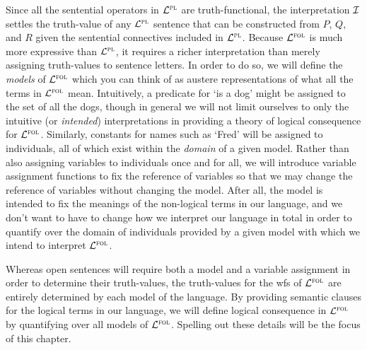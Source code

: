 Since all the sentential operators in $\mathcal{L}^{\textsc{pl}}$ are truth-functional, the interpretation $\mathcal{I}$ settles the truth-value of any $\mathcal{L}^{\textsc{pl}}$ sentence that can be constructed from $P$, $Q$, and $R$ given the sentential connectives included in $\mathcal{L}^{\textsc{pl}}$.
Because $\mathcal{L}^{\textsc{fol}}$ is much more expressive than $\mathcal{L}^{\textsc{pl}}$, it requires a richer interpretation than merely assigning truth-values to sentence letters.
In order to do so, we will define the \textit{models} of $\mathcal{L}^{\textsc{fol}}$ which you can think of as austere representations of what all the terms in $\mathcal{L}^{\textsc{fol}}$ mean. 
Intuitively, a predicate for `is a dog' might be assigned to the set of all the dogs, though in general we will not limit ourselves to only the intuitive (or \textit{intended}) interpretations in providing a theory of logical consequence for $\mathcal{L}^{\textsc{fol}}$.
Similarly, constants for names such as `Fred' will be assigned to individuals, all of which exist within the \textit{domain} of a given model.
Rather than also assigning variables to individuals once and for all, we will introduce variable assignment functions to fix the reference of variables so that we may change the reference of variables without changing the model.
After all, the model is intended to fix the meanings of the non-logical terms in our language, and we don't want to have to change how we interpret our language in total in order to quantify over the domain of individuals provided by a given model with which we intend to interpret $\mathcal{L}^{\textsc{fol}}$.

Whereas open sentences will require both a model and a variable assignment in order to determine their truth-values, the truth-values for the wfs of $\mathcal{L}^{\textsc{fol}}$ are entirely determined by each model of the language.
By providing semantic clauses for the logical terms in our language, we will define logical consequence in $\mathcal{L}^{\textsc{fol}}$ by quantifying over all models of $\mathcal{L}^{\textsc{fol}}$.
Spelling out these details will be the focus of this chapter.






